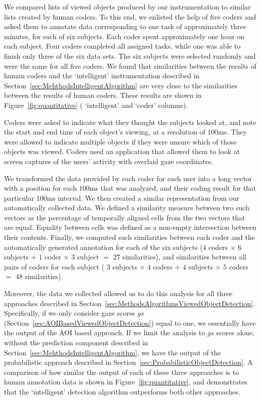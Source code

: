 We compared lists of viewed objects produced by our instrumentation to similar lists created by human coders. To this end, we enlisted the help of five coders and asked them to annotate data corresponding to one task of approximately three minutes, for each of six subjects.  Each coder spent approximately one hour on each subject. Four coders completed all assigned tasks, while one was able to finish only three of the six data sets. The six subjects were selected randomly and were the same for all five coders. We found that similarities between the results of human coders and the `intelligent' instrumentation described in Section~\ref{sec:MehthodsIntelligentAlgorithm} are very close to the similarities between the results of human coders. These results are shown in Figure~\ref{fig:quantitative} ( `intelligent' and `coder' columns).

Coders were asked to indicate what they thought the subjects looked at, and note the start and end time of each object's viewing, at a resolution of $100$ms. They were allowed to indicate multiple objects if they were unsure which of those objects was viewed. Coders used an application that allowed them to look at screen captures of the users' activity with overlaid gaze coordinates. 

We transformed the data provided by each coder for each user into a long vector with a position for each $100$ms that was analyzed, and their coding result for that particular $100$ms interval. We then created a similar representation from our automatically collected data. We defined a similarity measure between two such vectors as the percentage of temporally aligned cells from the two vectors that are equal. Equality between cells was defined as a non-empty intersection between their contents. Finally, we computed such similarities between each coder and the automatically generated annotation for each of the six subjects ($4$ coders $\times$ $6$ subjects $+$ $1$ coder $\times$ $3$ subject $=$ $27$ similarities), and similarities between all pairs of coders for each subject ( $3$ subjects $\times$ $4$ coders $+$ $4$ subjects $\times$ $5$ coders $=$ $48$ similarities). 

Moreover, the data we collected allowed us to do this analysis for all three approaches described in Section~\ref{sec:MethodsAlgorithmsViewedObjectDetection}. Specifically, if we only consider gaze scores $gs$ (Section~\ref{sec:AOIBasedViewedObjectDetection}) equal to one, we essentially have the output of the AOI based approach. If we limit the analysis to $gs$ scores alone, without the prediction component described in Section~\ref{sec:MehthodsIntelligentAlgorithm}, we have the output of the probabilistic approach described in Section~\ref{sec:ProbabilisticObjectDetection}. A comparison of how similar the output of each of these three approaches is to human annotation data is shown in Figure~\ref{fig:quantitative}, and demonstrates that the `intelligent' detection algorithm outperforms both other approaches.

